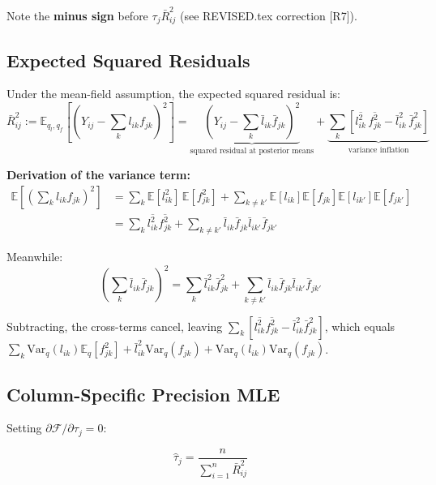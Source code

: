 \documentclass[11pt]{article}
\newcommand{\lbar}[2]{\bar{l}_{#1#2}}
\newcommand{\fbar}[2]{\bar{f}_{#1#2}}
\newcommand{\lsec}[2]{\overline{l^2_{#1#2}}}
\newcommand{\fsec}[2]{\overline{f^2_{#1#2}}}
\begin{document}
Note the \textbf{minus sign} before $\tau_j\bar{R}^2_{ij}$ (see REVISED.tex
correction [R7]).

\subsection{Expected Squared Residuals}

Under the mean-field assumption, the expected squared residual is:
\begin{equation}\label{eq:expected-R2}
  \bar{R}^2_{ij} := \mathbb{E}_{q_l,q_f}\!\left[\!\left(Y_{ij}
    - \sum_k l_{ik}f_{jk}\right)^{\!2}\right]
  = \underbrace{\left(Y_{ij} - \sum_k \lbar{i}{k}\fbar{j}{k}\right)^{\!2}}_{\text{squared residual at posterior means}}
    + \underbrace{\sum_k\!\left[\lsec{i}{k}\,\fsec{j}{k}
               - \lbar{i}{k}^2\,\fbar{j}{k}^2\right]}_{\text{variance inflation}}
\end{equation}

\textbf{Derivation of the variance term:}
\begin{align}
  \mathbb{E}\!\left[\left(\sum_k l_{ik}f_{jk}\right)^{\!2}\right]
  &= \sum_k \mathbb{E}[l_{ik}^2]\,\mathbb{E}[f_{jk}^2]
     + \sum_{k\neq k'}\mathbb{E}[l_{ik}]\mathbb{E}[f_{jk}]\mathbb{E}[l_{ik'}]\mathbb{E}[f_{jk'}] \\
  &= \sum_k \lsec{i}{k}\fsec{j}{k}
     + \sum_{k\neq k'}\lbar{i}{k}\fbar{j}{k}\lbar{i}{k'}\fbar{j}{k'}
\end{align}

Meanwhile:
\[
  \left(\sum_k \lbar{i}{k}\fbar{j}{k}\right)^{2}
  = \sum_k \lbar{i}{k}^2\fbar{j}{k}^2
    + \sum_{k\neq k'}\lbar{i}{k}\fbar{j}{k}\lbar{i}{k'}\fbar{j}{k'}
\]

Subtracting, the cross-terms cancel, leaving
$\sum_k [\lsec{i}{k}\fsec{j}{k} - \lbar{i}{k}^2\fbar{j}{k}^2]$, which
equals $\sum_k \mathrm{Var}_q(l_{ik})\mathbb{E}_q[f_{jk}^2] + \lbar{i}{k}^2\mathrm{Var}_q(f_{jk})
+ \mathrm{Var}_q(l_{ik})\mathrm{Var}_q(f_{jk})$.

\subsection{Column-Specific Precision MLE}

Setting $\partial\mathcal{F}/\partial\tau_j = 0$:

\begin{equation}\label{eq:tau-colspec}
  \boxed{\hat{\tau}_j = \frac{n}{\sum_{i=1}^n \bar{R}^2_{ij}}}
\end{equation}
\end{document}

